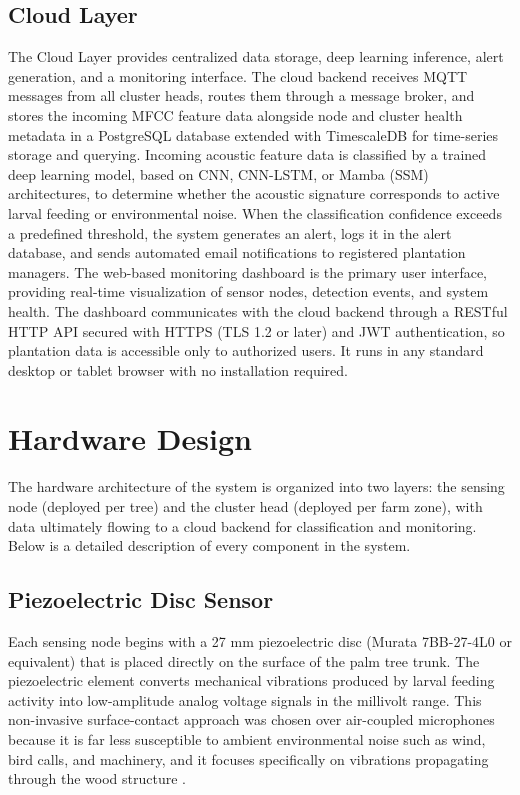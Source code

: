 \documentclass[12pt,a4paper,oneside]{memoir}
\begin{document}
\subsection{Cloud Layer}

The Cloud Layer provides centralized data storage, deep learning inference, alert generation, and a monitoring interface. The cloud backend receives MQTT messages from all cluster heads, routes them through a message broker, and stores the incoming MFCC feature data alongside node and cluster health metadata in a PostgreSQL database extended with TimescaleDB for time-series storage and querying. Incoming acoustic feature data is classified by a trained deep learning model, based on CNN, CNN-LSTM, or Mamba (SSM) architectures, to determine whether the acoustic signature corresponds to active larval feeding or environmental noise. When the classification confidence exceeds a predefined threshold, the system generates an alert, logs it in the alert database, and sends automated email notifications to registered plantation managers. The web-based monitoring dashboard is the primary user interface, providing real-time visualization of sensor nodes, detection events, and system health. The dashboard communicates with the cloud backend through a RESTful HTTP API secured with HTTPS (TLS 1.2 or later) and JWT authentication, so plantation data is accessible only to authorized users. It runs in any standard desktop or tablet browser with no installation required.

\section{Hardware Design}

The hardware architecture of the system is organized into two layers: the sensing node (deployed per tree) and the cluster head (deployed per farm zone), with data ultimately flowing to a cloud backend for classification and monitoring. Below is a detailed description of every component in the system.

\subsection{Piezoelectric Disc Sensor}

Each sensing node begins with a 27 mm piezoelectric disc (Murata 7BB-27-4L0 or equivalent) that is placed directly on the surface of the palm tree trunk. The piezoelectric element converts mechanical vibrations produced by larval feeding activity into low-amplitude analog voltage signals in the millivolt range. This non-invasive surface-contact approach was chosen over air-coupled microphones because it is far less susceptible to ambient environmental noise such as wind, bird calls, and machinery, and it focuses specifically on vibrations propagating through the wood structure \cite{pinhas2008,karar2022}.
\end{document}
